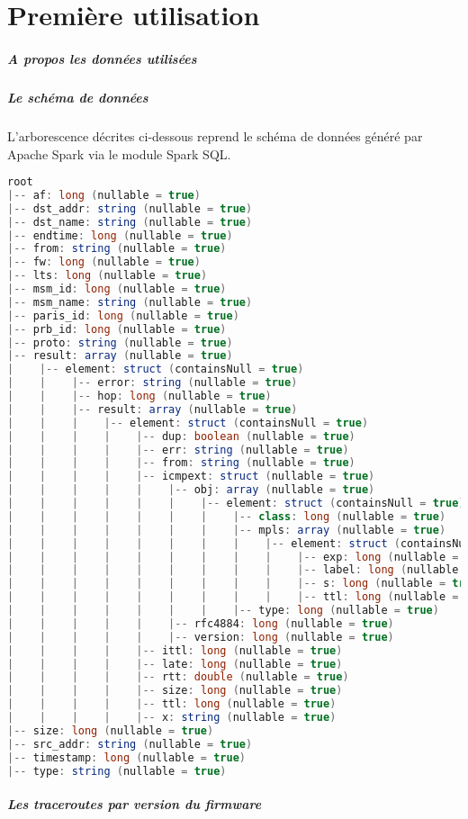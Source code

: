 \documentclass[]{report}
\begin{document}
\chapter{Première utilisation}

\paragraph{A propos les données utilisées}

\newpage
\paragraph{Le schéma de données }

L'arborescence décrites ci-dessous reprend le schéma de données généré par Apache Spark via le module Spark SQL.

\begin{lstlisting}[language=Java]
root
|-- af: long (nullable = true)
|-- dst_addr: string (nullable = true)
|-- dst_name: string (nullable = true)
|-- endtime: long (nullable = true)
|-- from: string (nullable = true)
|-- fw: long (nullable = true)
|-- lts: long (nullable = true)
|-- msm_id: long (nullable = true)
|-- msm_name: string (nullable = true)
|-- paris_id: long (nullable = true)
|-- prb_id: long (nullable = true)
|-- proto: string (nullable = true)
|-- result: array (nullable = true)
|    |-- element: struct (containsNull = true)
|    |    |-- error: string (nullable = true)
|    |    |-- hop: long (nullable = true)
|    |    |-- result: array (nullable = true)
|    |    |    |-- element: struct (containsNull = true)
|    |    |    |    |-- dup: boolean (nullable = true)
|    |    |    |    |-- err: string (nullable = true)
|    |    |    |    |-- from: string (nullable = true)
|    |    |    |    |-- icmpext: struct (nullable = true)
|    |    |    |    |    |-- obj: array (nullable = true)
|    |    |    |    |    |    |-- element: struct (containsNull = true)
|    |    |    |    |    |    |    |-- class: long (nullable = true)
|    |    |    |    |    |    |    |-- mpls: array (nullable = true)
|    |    |    |    |    |    |    |    |-- element: struct (containsNull = true)
|    |    |    |    |    |    |    |    |    |-- exp: long (nullable = true)
|    |    |    |    |    |    |    |    |    |-- label: long (nullable = true)
|    |    |    |    |    |    |    |    |    |-- s: long (nullable = true)
|    |    |    |    |    |    |    |    |    |-- ttl: long (nullable = true)
|    |    |    |    |    |    |    |-- type: long (nullable = true)
|    |    |    |    |    |-- rfc4884: long (nullable = true)
|    |    |    |    |    |-- version: long (nullable = true)
|    |    |    |    |-- ittl: long (nullable = true)
|    |    |    |    |-- late: long (nullable = true)
|    |    |    |    |-- rtt: double (nullable = true)
|    |    |    |    |-- size: long (nullable = true)
|    |    |    |    |-- ttl: long (nullable = true)
|    |    |    |    |-- x: string (nullable = true)
|-- size: long (nullable = true)
|-- src_addr: string (nullable = true)
|-- timestamp: long (nullable = true)
|-- type: string (nullable = true)
\end{lstlisting}


\paragraph{Les traceroutes par version du firmware}
\end{document}
